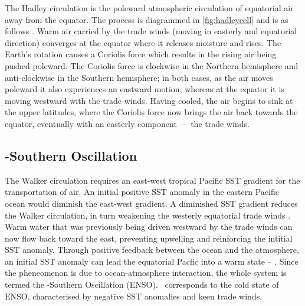 The Hadley circulation is the poleward atmospheric circulation of equatorial air
away from the equator. The process is diagrammed in \ref{fig:hadleycell} and is as
follows \citep{geomar6557}. Warm air carried by the trade winds (moving in
easterly and equatorial direction) converges at the equator where it releases
moisture and rises. The Earth's rotation causes a Coriolis force which results
in the rising air being pushed poleward. The Coriolis force is clockwise in the
Northern hemisphere and anti-clockwise in the Southern hemisphere; in both
cases, as the air moves poleward it also experiences an eastward motion, whereas
at the equator it is moving westward with the trade winds. Having cooled, the
air begins to sink at the upper latitudes, where the Coriolis force now brings
the air back towards the equator, eventually with an easterly component --- the
trade winds.





\subsection{\elnino-Southern Oscillation}
The Walker circulation requires an east-west tropical Pacific SST gradient for
the transportation of air. An initial positive SST anomaly in the eastern
Pacific ocean would diminish the east-west gradient. A diminished SST gradient
reduces the Walker circulation, in turn weakening the westerly equatorial trade
winds \citep{lindzen1987}. Warm water that was previously being driven westward
by the trade winds can now flow back toward the east, preventing upwelling and
reinforcing the intitial SST anomaly. Through positive feedback between the
ocean and the atmosphere, an initial SST anomaly can lead the equatorial Pacfic
into a warm state -- \elnino. Since the pheneomenon is due to ocean-atmosphere
interaction, the whole system is termed the \elnino-Southern Oscillation
(ENSO). {}\nina\ corresponds to the cold state of ENSO, characterised by
negative SST anomalies and keen trade winds.

